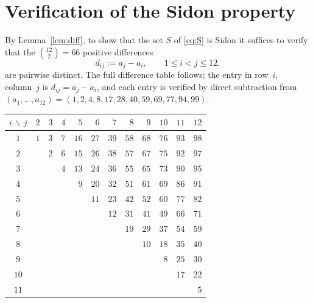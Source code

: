 \documentclass[a4paper,11pt]{amsart}
\theoremstyle{plain}
\theoremstyle{definition}
\begin{document}
\section{Verification of the Sidon property}

By Lemma~\ref{lem:diff}, to show that the set $S$ of \eqref{eq:S} is
Sidon it suffices to verify that the $\binom{12}{2}=66$ positive
differences
\[
d_{ij}:=a_j-a_i,\qquad 1\leq i<j\leq 12,
\]
are pairwise distinct. The full difference table follows; the entry in
row~$i$, column~$j$ is $d_{ij}=a_j-a_i$, and each entry is verified by
direct subtraction from
$(a_1,\dots,a_{12})=(1,2,4,8,17,28,40,59,69,77,94,99)$.

\medskip
\begin{center}
\renewcommand{\arraystretch}{1.05}
\begin{tabular}{c|rrrrrrrrrrr}
$i\,\backslash\,j$ & $2$ & $3$ & $4$ & $5$ & $6$ & $7$ & $8$ & $9$ & $10$ & $11$ & $12$\\
\hline
$1$  & $1$ & $3$ & $7$ & $16$ & $27$ & $39$ & $58$ & $68$ & $76$ & $93$ & $98$\\
$2$  &     & $2$ & $6$ & $15$ & $26$ & $38$ & $57$ & $67$ & $75$ & $92$ & $97$\\
$3$  &     &     & $4$ & $13$ & $24$ & $36$ & $55$ & $65$ & $73$ & $90$ & $95$\\
$4$  &     &     &     & $9$  & $20$ & $32$ & $51$ & $61$ & $69$ & $86$ & $91$\\
$5$  &     &     &     &      & $11$ & $23$ & $42$ & $52$ & $60$ & $77$ & $82$\\
$6$  &     &     &     &      &      & $12$ & $31$ & $41$ & $49$ & $66$ & $71$\\
$7$  &     &     &     &      &      &      & $19$ & $29$ & $37$ & $54$ & $59$\\
$8$  &     &     &     &      &      &      &      & $10$ & $18$ & $35$ & $40$\\
$9$  &     &     &     &      &      &      &      &      & $8$  & $25$ & $30$\\
$10$ &     &     &     &      &      &      &      &      &      & $17$ & $22$\\
$11$ &     &     &     &      &      &      &      &      &      &      & $5$
\end{tabular}
\end{center}
\medskip
\end{document}
